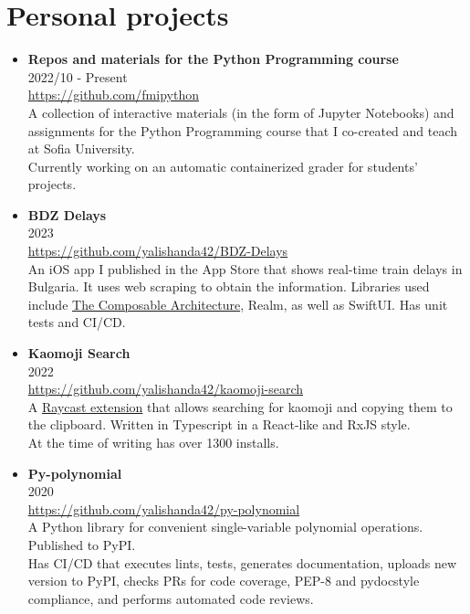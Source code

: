 \documentclass[11pt,a4paper]{article}
\begin{document}
\section{Personal projects}
\begin{itemize}[leftmargin=*]
    \item \textbf{Repos and materials for the Python Programming course} \\
    2022/10 - Present \\
    \href{https://github.com/fmipython}{https://github.com/fmipython} \\
    A collection of interactive materials (in the form of Jupyter Notebooks) and assignments for the Python Programming course
    that I co-created and teach at Sofia University. \\
    Currently working on an automatic containerized grader for students' projects.

    \item \textbf{BDZ Delays} \\
    2023 \\
    \href{https://github.com/yalishanda42/BDZ-Delays}{https://github.com/yalishanda42/BDZ-Delays} \\
    An iOS app I published in the App Store that shows real-time train delays in Bulgaria.
    It uses web scraping to obtain the information.
    Libraries used include \href{https://github.com/pointfreeco/swift-composable-architecture}{The Composable Architecture},
    Realm, as well as SwiftUI. Has unit tests and CI/CD.

    \item \textbf{Kaomoji Search} \\
    2022 \\
    \href{https://github.com/yalishanda42/kaomoji-search}{https://github.com/yalishanda42/kaomoji-search} \\
    A \href{https://www.raycast.com/yalishanda/kaomoji-search}{Raycast extension} that allows searching for kaomoji and copying them to the clipboard.
    Written in Typescript in a React-like and RxJS style. \\
    At the time of writing has over 1300 installs.
    
    \item \textbf{Py-polynomial} \\
    2020 \\
    \href{https://github.com/yalishanda42/py-polynomial}{https://github.com/yalishanda42/py-polynomial} \\
    A Python library for convenient single-variable polynomial operations. Published to PyPI. \\
    Has CI/CD that executes lints, tests, generates documentation, uploads new version to PyPI,
    checks PRs for code coverage, PEP-8 and pydocstyle compliance, and performs automated code reviews.
    

\end{itemize}
\end{document}
